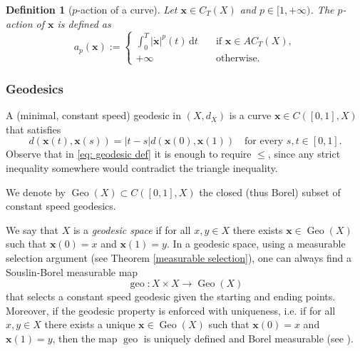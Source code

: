\documentclass[10pt,leqno]{amsart}
\numberwithin{equation}{section}
\newtheorem{df}[teorema]{Definition}
\renewcommand{\d}{\mathrm{d}}
\begin{document}
\begin{df}[$p$-action of a curve]\label{ac energies}
    Let $\boldsymbol{x}\in C_T(X)$ and $p\in [1,+\infty)$. The $p$-action of $\boldsymbol{x}$ is defined as  
    \begin{equation}
        a_p(\boldsymbol{x}):= 
        \begin{cases}
            \displaystyle
            \int_0^T |\dot{\boldsymbol{x}}|^p(t) \,\d t \quad & \text{if } \boldsymbol{x}\in AC_T(X),
            \\
            +\infty & \text{otherwise.}
        \end{cases}
    \end{equation}
\end{df}
\subsubsection{Geodesics}\label{subsub: geod} A (minimal, constant speed)
geodesic in $(X,d_X)$ 
is a curve  $\boldsymbol{x}\in C([0,1],X)$ that satisfies 
\begin{equation}\label{eq: geodesic def}
    d(\boldsymbol{x}(t),\boldsymbol{x}(s)) = |t-s|d(\boldsymbol{x}(0),\boldsymbol{x}(1)) \quad 
    \text{for every } s,t\in[0,1].
\end{equation}
Observe that in \eqref{eq: geodesic def} it is enough to require 
$\le$, since any strict inequality somewhere would contradict the triangle inequality.

We denote by $\operatorname{Geo}(X)\subset C([0,1],X)$ the 
closed (thus Borel) subset of constant speed geodesics. 

We say that $X$ is a \textit{geodesic space} if for all $x,y \in X$ there exists $\boldsymbol{x}\in \operatorname{Geo}(X)$ such that $\boldsymbol{x}(0) = x$ and $\boldsymbol{x}(1) = y$. In a geodesic space, using a measurable selection argument (see Theorem \ref{measurable selection}), one can always find a Souslin-Borel measurable map 
\begin{equation}\label{eq: geo map}
    \operatorname{geo}:X \times X \to \operatorname{Geo}(X)
\end{equation}
that selects a constant speed geodesic given the starting and ending points. Moreover, if the geodesic property is enforced with uniqueness, i.e. if for all $x,y \in X$ there exists a unique $\boldsymbol{x}\in \operatorname{Geo}(X)$ such that $\boldsymbol{x}(0) = x$ and $\boldsymbol{x}(1) = y$, then the map $\operatorname{geo}$ is uniquely defined and Borel measurable (see \cite[Lemma 6.7.1]{Bogachev07}). 
\end{document}
